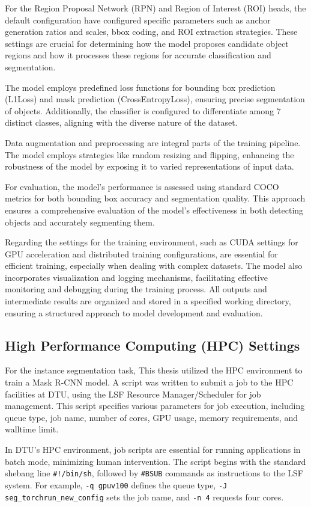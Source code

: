 For the Region Proposal Network (RPN) and Region of Interest (ROI) heads, the default configuration have configured specific parameters such as anchor generation ratios and scales, bbox coding, and ROI extraction strategies. These settings are crucial for determining how the model proposes candidate object regions and how it processes these regions for accurate classification and segmentation.

The model employs predefined loss functions for bounding box prediction (L1Loss) and mask prediction (CrossEntropyLoss), ensuring precise segmentation of objects. Additionally, the classifier is configured to differentiate among 7 distinct classes, aligning with the diverse nature of the dataset.

Data augmentation and preprocessing are integral parts of the training pipeline. The model employs strategies like random resizing and flipping, enhancing the robustness of the model by exposing it to varied representations of input data.

For evaluation, the model's performance is assessed using standard COCO metrics for both bounding box accuracy and segmentation quality. This approach ensures a comprehensive evaluation of the model's effectiveness in both detecting objects and accurately segmenting them.

Regarding the settings for the training environment, such as CUDA settings for GPU acceleration and distributed training configurations, are essential for efficient training, especially when dealing with complex datasets. The model also incorporates visualization and logging mechanisms, facilitating effective monitoring and debugging during the training process. All outputs and intermediate results are organized and stored in a specified working directory, ensuring a structured approach to model development and evaluation.
\subsection{High Performance Computing (HPC) Settings}

For the instance segmentation task, This thesis utilized the HPC environment to train a Mask R-CNN model. A script was written to submit a job to the HPC facilities at DTU, using the LSF Resource Manager/Scheduler for job management. This script specifies various parameters for job execution, including queue type, job name, number of cores, GPU usage, memory requirements, and walltime limit.

In DTU's HPC environment, job scripts are essential for running applications in batch mode, minimizing human intervention. The script begins with the standard shebang line \texttt{\#!/bin/sh}, followed by \texttt{\#BSUB} commands as instructions to the LSF system. For example, \texttt{-q gpuv100} defines the queue type, \texttt{-J seg\_torchrun\_new\_config} sets the job name, and \texttt{-n 4} requests four cores.

